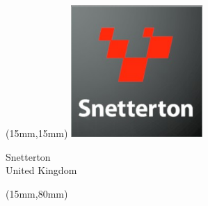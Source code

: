 \begin{textblock*}{50mm}(15mm,15mm)%
\includegraphics[width=50mm]{LG/2015-05-20_00095.png}
\par Snetterton\\ United Kingdom
\end{textblock*}
\begin{textblock*}{185mm}(15mm,80mm)%
\end{textblock*}
